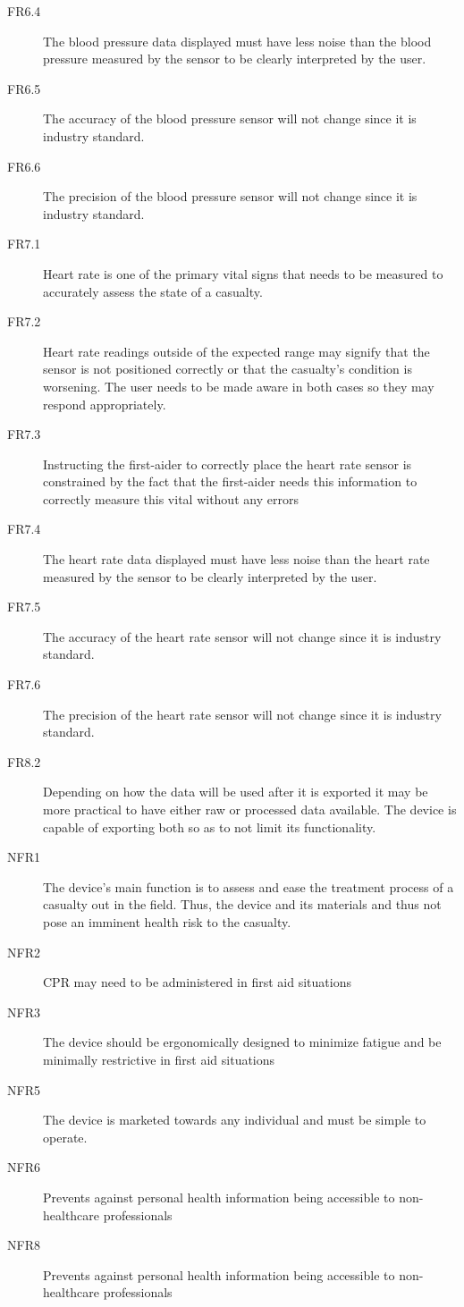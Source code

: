 \documentclass{article}
\begin{document}
\begin{description}
            \item[FR6.4] The blood pressure data displayed must have less noise than the blood pressure measured by the sensor to be clearly interpreted by the user.
            \item[FR6.5] The accuracy of the blood pressure sensor will not change since it is industry standard.
            \item[FR6.6] The precision of the blood pressure sensor will not change since it is industry standard.
            \item[FR7.1] Heart rate is one of the primary vital signs that needs to be measured to accurately assess the state of a casualty.
            \item[FR7.2] Heart rate readings outside of the expected range may signify that the sensor is not positioned correctly or that the casualty's condition is worsening. The user needs to be made aware in both cases so they may respond appropriately. 
            \item [FR7.3] Instructing the first-aider to correctly place the heart rate sensor is constrained by the fact that the first-aider needs this information to correctly measure this vital without any errors
            \item[FR7.4] The heart rate data displayed must have less noise than the heart rate measured by the sensor to be clearly interpreted by the user.
            \item[FR7.5] The accuracy of the heart rate sensor will not change since it is industry standard. 
            \item[FR7.6] The precision of the heart rate sensor will not change since it is industry standard.
            \item[FR8.2] Depending on how the data will be used after it is exported it may be more practical to have either raw or processed data available. The device is capable of exporting both so as to not limit its functionality. 
            \item[NFR1] The device's main function is to assess and ease the treatment process of a casualty out in the field. Thus, the device and its materials and thus not pose an imminent health risk to the casualty. 
            \item[NFR2] CPR may need to be administered in first aid situations
            \item[NFR3] The device should be ergonomically designed to minimize fatigue and be minimally restrictive in first aid situations 
            \item[NFR5] The device is marketed towards any individual and must be simple to operate.
            \item[NFR6] Prevents against personal health information being accessible to non-healthcare professionals
            \item[NFR8] Prevents against personal health information being accessible to non-healthcare professionals
        \end{description}
\end{document}
